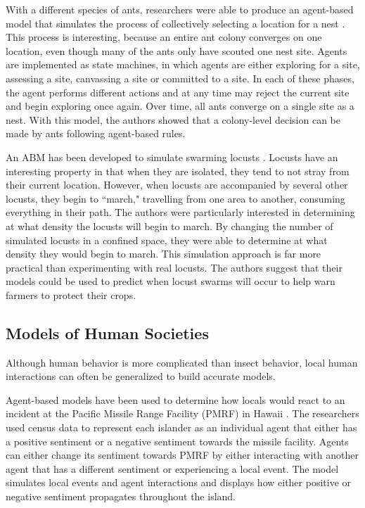 With a different species of ants, researchers were able to produce an agent-based model that simulates the process of collectively selecting a location for a nest \cite{pratt2005agent}.
This process is interesting, because an entire ant colony converges on one location, even though many of the ants only have scouted one nest site.
Agents are implemented as state machines, in which agents are either exploring for a site, assessing a site, canvassing a site or committed to a site.
In each of these phases, the agent performs different actions and at any time may reject the current site and begin exploring once again.
Over time, all ants converge on a single site as a nest.
With this model, the authors showed that a colony-level decision can be made by ants following agent-based rules.

An ABM has been developed to simulate swarming locusts \cite{buhl2006dom}.
Locusts have an interesting property in that when they are isolated, they tend to not stray from their current location.
However, when locusts are accompanied by several other locusts, they begin to ``march," travelling from one area to another, consuming everything in their path.
The authors were particularly interested in determining at what density the locusts will begin to march.
By changing the number of simulated locusts in a confined space, they were able to determine at what density they would begin to march.
This simulation approach is far more practical than experimenting with real locusts.
The authors suggest that their models could be used to predict when locust swarms will occur to help warn farmers to protect their crops.


\subsection{Models of Human Societies}

Although human behavior is more complicated than insect behavior, local human interactions can often be generalized to build accurate models.

Agent-based models have been used to determine how locals would react to an incident at the Pacific Missile Range Facility (PMRF) in Hawaii \cite{zanbaka}.
The researchers used census data to represent each islander as an individual agent that either has a positive sentiment or a negative sentiment towards the missile facility.
Agents can either change its sentiment towards PMRF by either interacting with another agent that has a different sentiment or experiencing a local event.
The model simulates local events and agent interactions and displays how either positive or negative sentiment propagates throughout the island.

